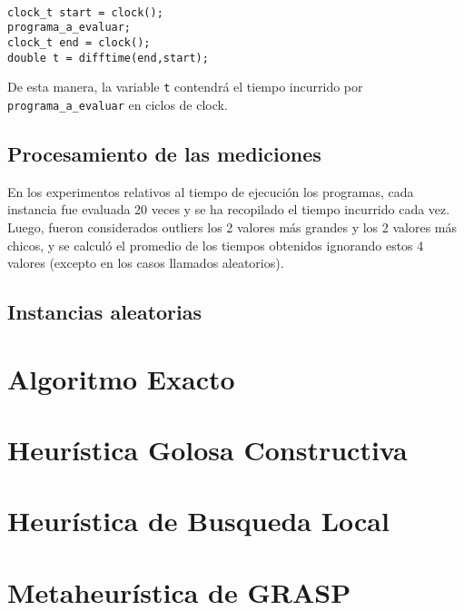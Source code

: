 \documentclass[a4paper]{article}
\begin{document}
\begin{verbatim}

clock_t start = clock();
programa_a_evaluar;
clock_t end = clock();
double t = difftime(end,start);

\end{verbatim}

De esta manera, la variable {\tt t} contendrá el tiempo incurrido por {\tt programa_a_evaluar} en ciclos de clock.

\subsection{Procesamiento de las mediciones}

En los experimentos relativos al tiempo de ejecución los programas, cada instancia fue evaluada 20 veces y se ha recopilado el tiempo incurrido cada vez. Luego, fueron considerados outliers los 2 valores más grandes y los 2 valores más chicos, y se calculó el promedio de los tiempos obtenidos ignorando estos 4 valores (excepto en los casos llamados aleatorios).

\subsection{Instancias aleatorias}



\vspace*{0.6cm}

\section{Algoritmo Exacto}
\vspace*{0.3cm}


\vspace*{0.6cm}
\section{Heurística Golosa Constructiva}
\vspace*{0.3cm}


\newpage
\section{Heurística de Busqueda Local}


\newpage
\section{Metaheurística de GRASP}

\end{document}
